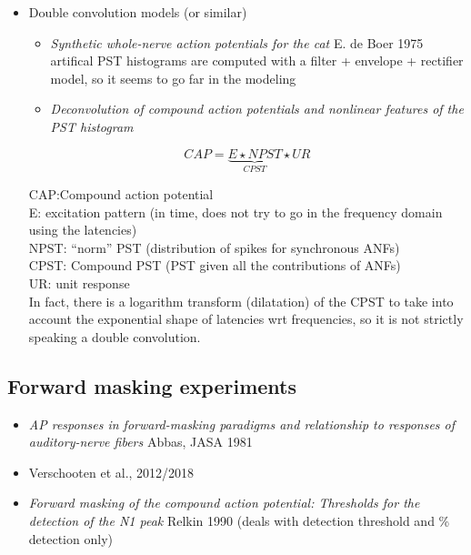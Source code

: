 \documentclass[]{article}
\providecommand{\tightlist}{%
  \setlength{\itemsep}{0pt}\setlength{\parskip}{0pt}}
\begin{document}
\clearpage

\begin{itemize}
\tightlist
\item
  Double convolution models (or similar)

  \begin{itemize}
  \tightlist
  \item
    \emph{Synthetic whole-nerve action potentials for the cat} E. de
    Boer 1975 artifical PST histograms are computed with a filter +
    envelope + rectifier model, so it seems to go far in the modeling
  \item
    \emph{Deconvolution of compound action potentials and nonlinear
    features of the PST histogram} \citep{Bappert1980}
  \end{itemize}

  \[CAP = \underbrace{E \star NPST}_{CPST} \star UR\]

  CAP:Compound action potential\\
  E: excitation pattern (in time, does not try to go in the frequency
  domain using the latencies)\\
  NPST: ``norm'' PST (distribution of spikes for synchronous ANFs)\\
  CPST: Compound PST (PST given all the contributions of ANFs)\\
  UR: unit response\\
  In fact, there is a logarithm transform (dilatation) of the CPST to
  take into account the exponential shape of latencies wrt frequencies,
  so it is not strictly speaking a double convolution.
\end{itemize}

\hypertarget{forward-masking-experiments}{%
\subsection{Forward masking
experiments}\label{forward-masking-experiments}}

\begin{itemize}
\tightlist
\item
  \emph{AP responses in forward-masking paradigms and relationship to
  responses of auditory-nerve fibers} Abbas, JASA 1981 \citep{Abbas1981}
\item
  Verschooten et al., 2012/2018 \citep{verschooten2012, Verschooten2018}
\item
  \emph{Forward masking of the compound action potential: Thresholds for
  the detection of the N1 peak} Relkin 1990 (deals with detection
  threshold and \% detection only) \citep{Relkin1991}
\end{itemize}
\end{document}
